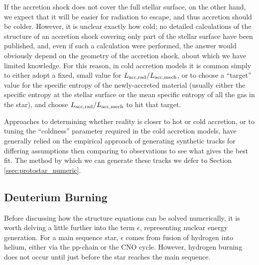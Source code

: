 If the accretion shock does not cover the full stellar surface, on the other hand, we expect that it will be easier for radiation to escape, and thus accretion should be colder. However, it is unclear exactly how cold; no detailed calculations of the structure of an accretion shock covering only part of the stellar surface have been published, and, even if such a calculation were performed, the answer would obviously depend on the geometry of the accretion shock, about which we have limited knowledge. For this reason, in cold accretion models it is common simply to either adopt a fixed, small value for $L_{\rm acc,rad}/L_{\rm acc,mech}$, or to choose a ``target'' value for the specific entropy of the newly-accreted material (usually either the specific entropy at the stellar surface or the mean specific entropy of all the gas in the star), and choose $L_{\rm acc,rad}/L_{\rm acc,mech}$ to hit that target. 

Approaches to determining whether reality is closer to hot or cold accretion, or to tuning the ``coldness'' parameter required in the cold accretion models, have generally relied on the empirical approach of generating synthetic tracks for differing assumptions then comparing to observations to see what gives the best fit. The method by which we can generate these tracks we defer to Section \ref{ssec:protostar_numeric}.

\subsection{Deuterium Burning}

Before discussing how the structure equations can be solved numerically, it is worth delving a little further into the term $\epsilon$, representing nuclear energy generation. For a main sequence star, $\epsilon$ comes from fusion of hydrogen into helium, either via the pp-chain or the CNO cycle. However, hydrogen burning does not occur until just before the star reaches the main sequence.

